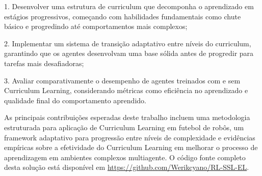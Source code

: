 1. Desenvolver uma estrutura de curriculum que decomponha o aprendizado em estágios progressivos, começando com habilidades fundamentais como chute básico e progredindo até comportamentos mais complexos;

2. Implementar um sistema de transição adaptativo entre níveis do curriculum, garantindo que os agentes desenvolvam uma base sólida antes de progredir para tarefas mais desafiadoras;

3. Avaliar comparativamente o desempenho de agentes treinados com e sem Curriculum Learning, considerando métricas como eficiência no aprendizado e qualidade final do comportamento aprendido.

As principais contribuições esperadas deste trabalho incluem uma metodologia estruturada para aplicação de Curriculum Learning em futebol de robôs, um framework adaptativo para progressão entre níveis de complexidade e evidências empíricas sobre a efetividade do Curriculum Learning em melhorar o processo de aprendizagem em ambientes complexos multiagente. O código fonte completo desta solução está disponível em \url{https://github.com/Werikcyano/RL-SSL-EL}.
